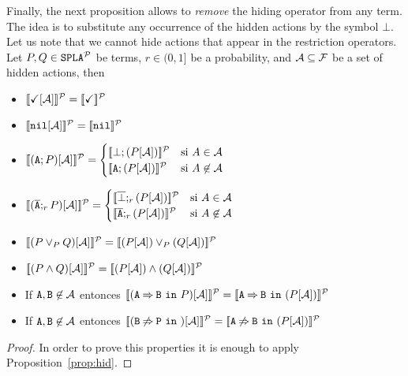 Finally, the next proposition allows to \emph{remove} the hiding
operator from any term. The idea is to substitute any occurrence of
the hidden actions by the symbol $\bot$. Let us note that we cannot
hide actions that appear in the restriction operators.  
\bprop
  Let $P,Q\in\mathtt{SPLA{^{\cal P}}}$ be terms, $r\in (0,1]$ be a probability, and 
  ${\cal A}\subseteq{\cal F}$ be a set of hidden actions, then
  \begin{itemize}
  \item $[\![\checkmark[{\cal A}]]\!]^{\cal P}=[\![\checkmark]\!]^{\cal P}$
  \item $[\![\mathtt{nil}[{\cal A}]]\!]^{\cal P}=[\![\mathtt{nil}]\!]^{\cal P}$
  \item
      $\semdenp{(\fA;P)\hide\calA}=
      \begin{cases}
        \semdenp{\bot;(P\hide\calA)} & \mbox{si } A\in\calA\\
        \semdenp{\fA;(P\hide\calA)} & \mbox{si } A\not\in\calA\\
      \end{cases}$
  \item
      $\semdenp{(\ofA;_rP)\hide\calA}=
      \begin{cases}
        \semdenp{\overline{\bot};_r(P\hide\calA)} & \mbox{si } A\in\calA\\
        \semdenp{\ofA;_r(P\hide\calA)} & \mbox{si } A\not\in\calA\\
      \end{cases}$
  \item $[\![(P\mathbin{\lor}_P Q)[{\cal A}]]\!]^{\cal P}=[\![(P[{\cal A}])\mathbin{\lor}_P (Q[{\cal A}])]\!]^{\cal P}$
  \item $[\![(P\mathbin{\wedge} Q)[{\cal A}]]\!]^{\cal P}=[\![(P[{\cal A}])\mathbin{\wedge} (Q[{\cal A}])]\!]^{\cal P}$
  \item If ${\mathtt{A}},{\mathtt{B}}\not\in{\cal A}$ entonces 
    $[\![(\mathtt{A}\mathbin{\Rightarrow}\mathtt{B}\ \mathtt{in}\ P)[{\cal A}]]\!]^{\cal P}=[\![\mathtt{A}\mathbin{\Rightarrow}\mathtt{B}\ \mathtt{in}\ (P[{\cal A}])]\!]^{\cal P}$
  \item If ${\mathtt{A}},{\mathtt{B}}\not\in{\cal A}$ entonces 
    $[\![(\mathtt{B}\mathbin{\not\Rightarrow}\mathtt{P}\ \mathtt{in}\ )[{\cal A}]]\!]^{\cal P}=[\![\mathtt{A}\mathbin{\not\Rightarrow}\mathtt{B}\ \mathtt{in}\ (P[{\cal A}])]\!]^{\cal P}$
  \end{itemize}
  \begin{proof}
    In order to prove this properties it is enough to apply
    Proposition~\ref{prop:hid}.
  \end{proof}
\eprop


